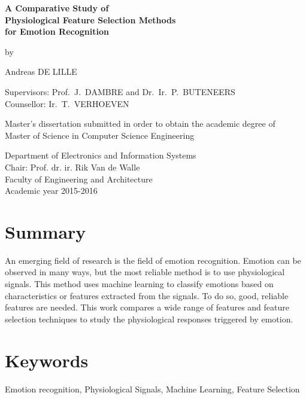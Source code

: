 
\newpage
{}
{
\setlength{\baselineskip}{14pt}
\setlength{\parindent}{0pt}
\setlength{\parskip}{8pt}

\begin{center}

\textbf{\huge
A Comparative Study of \\
Physiological Feature Selection Methods \\
for Emotion Recognition\\
}

by

Andreas DE LILLE

\end{center}

Supervisors: Prof.~J.~DAMBRE and Dr.~Ir.~P.~BUTENEERS \\
Counsellor: Ir.~T.~VERHOEVEN

Master's dissertation submitted in order to obtain the academic degree of\\
Master of Science in Computer Science Engineering

Department of Electronics and Information Systems\\
Chair: Prof. dr. ir. Rik Van de Walle\\
Faculty of Engineering and Architecture\\
Academic year 2015-2016\\



\section*{Summary}

An emerging field of research is the field of emotion recognition. Emotion can be observed in many ways, but the most reliable method is to use physiological signals. This method uses machine learning to classify emotions based on characteristics or features extracted from the signals. To do so, good, reliable features are needed. This work compares a wide range of features and feature selection techniques to study the physiological responses triggered by emotion.

\section*{Keywords}

Emotion recognition, Physiological Signals, Machine Learning, Feature Selection

}

\newpage %
